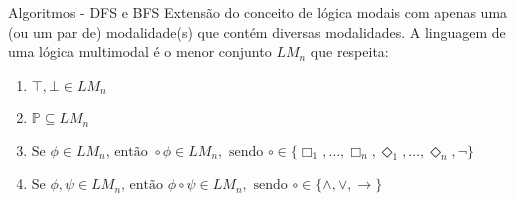 \begin{frame}{Algoritmos - DFS e BFS}
    Extensão do conceito de lógica modais com apenas uma (ou um par de) modalidade(s) que contém diversas modalidades.
    A linguagem de uma lógica multimodal é o menor conjunto \(LM_n\) que respeita:

    \vspace{\baselineskip}

    \begin{enumerate}
        \item \(\top, \bot \in LM_n \)
        \item \(\mathbb{P} \subseteq LM_n\)
        \item \(\text{Se } \phi \in LM_n \text{, então } \circ \phi \in LM_n, \text{ sendo } \circ \in \{\Box_1, \dots, \Box_n, \Diamond_1, \dots, \Diamond_n, \neg\}\)
        \item \(\text{Se } \phi, \psi \in LM_n \text{, então } \phi \circ \psi \in LM_n, \text{ sendo } \circ \in \{\land, \lor, \to\}\)
    \end{enumerate}


\end{frame}